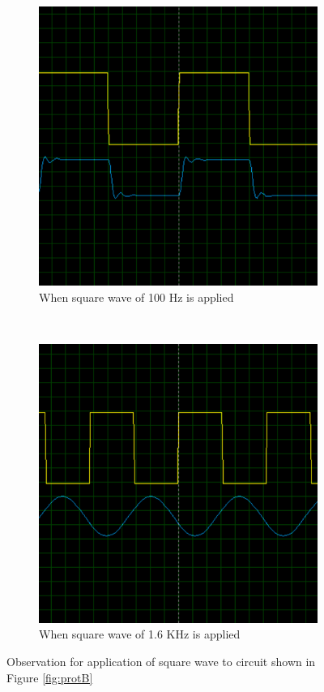 \documentclass{lab_sheet}
\begin{document}
\begin{figure}[H]
   \centering
   \begin{subfigure}{0.49\textwidth}
      \centering
   \includegraphics[width=0.9\linewidth]{../Figures/osc_b_1.png}
   \caption{When square wave of 100 Hz is applied}
   \end{subfigure}~
   \begin{subfigure}{0.49\textwidth}
      \centering
      \includegraphics[width=0.9\linewidth]{../Figures/osc_b_2.png}
      \caption{When square wave of 1.6 KHz is applied}
      \end{subfigure}
      \caption{Observation for application of square wave to circuit shown in Figure \ref{fig:protB}}
   \label{fig:osc_b}
\end{figure}
\end{document}
